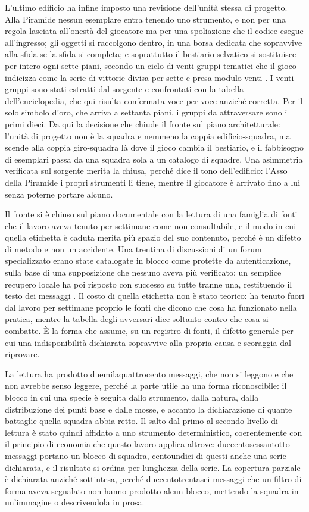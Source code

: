 L'ultimo edificio ha infine imposto una revisione dell'unità stessa di progetto. Alla Piramide nessun esemplare entra tenendo uno strumento, e non per una regola lasciata all'onestà del giocatore ma per una spoliazione che il codice esegue all'ingresso; gli oggetti si raccolgono dentro, in una borsa dedicata che sopravvive alla sfida se la sfida si completa; e soprattutto il bestiario selvatico si sostituisce per intero ogni sette piani, secondo un ciclo di venti gruppi tematici che il gioco indicizza come la serie di vittorie divisa per sette e presa modulo venti \cite{pokeemerald}. I venti gruppi sono stati estratti dal sorgente e confrontati con la tabella dell'enciclopedia, che qui risulta confermata voce per voce anziché corretta. Per il solo simbolo d'oro, che arriva a settanta piani, i gruppi da attraversare sono i primi dieci. Da qui la decisione che chiude il fronte sul piano architetturale: l'unità di progetto non è la squadra e nemmeno la coppia edificio-squadra, ma scende alla coppia giro-squadra là dove il gioco cambia il bestiario, e il fabbisogno di esemplari passa da una squadra sola a un catalogo di squadre. Una asimmetria verificata sul sorgente merita la chiusa, perché dice il tono dell'edificio: l'Asso della Piramide i propri strumenti li tiene, mentre il giocatore è arrivato fino a lui senza poterne portare alcuno.

Il fronte si è chiuso sul piano documentale con la lettura di una famiglia di fonti che il lavoro aveva tenuto per settimane come non consultabile, e il modo in cui quella etichetta è caduta merita più spazio del suo contenuto, perché è un difetto di metodo e non un accidente. Una trentina di discussioni di un forum specializzato erano state catalogate in blocco come protette da autenticazione, sulla base di una supposizione che nessuno aveva più verificato; un semplice recupero locale ha poi risposto con successo su tutte tranne una, restituendo il testo dei messaggi \cite{smogon-frontier-thread}. Il costo di quella etichetta non è stato teorico: ha tenuto fuori dal lavoro per settimane proprio le fonti che dicono che cosa ha funzionato nella pratica, mentre la tabella degli avversari dice soltanto contro che cosa si combatte. È la forma che assume, su un registro di fonti, il difetto generale per cui una indisponibilità dichiarata sopravvive alla propria causa e scoraggia dal riprovare.

La lettura ha prodotto duemilaquattrocento messaggi, che non si leggono e che non avrebbe senso leggere, perché la parte utile ha una forma riconoscibile: il blocco in cui una specie è seguita dallo strumento, dalla natura, dalla distribuzione dei punti base e dalle mosse, e accanto la dichiarazione di quante battaglie quella squadra abbia retto. Il salto dal primo al secondo livello di lettura è stato quindi affidato a uno strumento deterministico, coerentemente con il principio di economia che questo lavoro applica altrove: duecentosessantotto messaggi portano un blocco di squadra, centoundici di questi anche una serie dichiarata, e il risultato si ordina per lunghezza della serie. La copertura parziale è dichiarata anziché sottintesa, perché duecentotrentasei messaggi che un filtro di forma aveva segnalato non hanno prodotto alcun blocco, mettendo la squadra in un'immagine o descrivendola in prosa.

